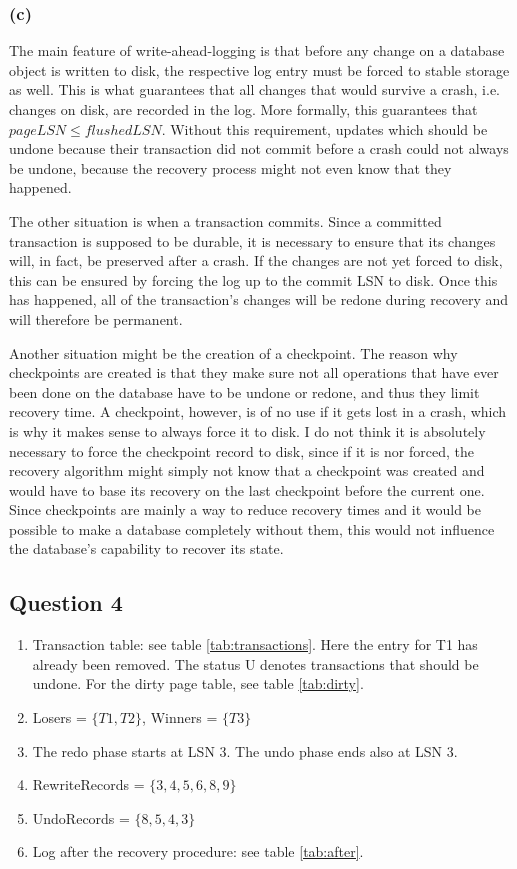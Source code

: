 \documentclass[12pt,a4paper]{article}
\begin{document}
\subsubsection*{(c)}
The main feature of write-ahead-logging is that before any change on a database object is written to disk, the respective log entry must be forced to stable storage as well. This is what guarantees that all changes that would survive a crash, i.e. changes on disk, are recorded in the log. More formally, this guarantees that $pageLSN \leq flushedLSN$. Without this requirement, updates which should be undone because their transaction did not commit before a crash could not always be undone, because the recovery process might not even know that they happened.

The other situation is when a transaction commits. Since a committed transaction is supposed to be durable, it is necessary to ensure that its changes will, in fact, be preserved after a crash. If the changes are not yet forced to disk, this can be ensured by forcing the log up to the commit LSN to disk. Once this has happened, all of the transaction's changes will be redone during recovery and will therefore be permanent.

Another situation might be the creation of a checkpoint. The reason why checkpoints are created is that they make sure not all operations that have ever been done on the database have to be undone or redone, and thus they limit recovery time. A checkpoint, however, is of no use if it gets lost in a crash, which is why it makes sense to always force it to disk. I do not think it is absolutely necessary to force the checkpoint record to disk, since if it is nor forced, the recovery algorithm might simply not know that a checkpoint was created and would have to base its recovery on the last checkpoint before the current one. Since checkpoints are mainly a way to reduce recovery times and it would be possible to make a database completely without them, this would not influence the database's capability to recover its state.


\subsection*{Question 4}
\label{sec:eq4}

\begin{enumerate}
  \item Transaction table: see table \ref{tab:transactions}. Here the entry for T1 has already been removed. The status U denotes transactions that should be undone. For the dirty page table, see table \ref{tab:dirty}.
  \item Losers = $\{T1, T2\}$, Winners = $\{T3\}$
  \item The redo phase starts at LSN 3. The undo phase ends also at LSN 3. 
  \item RewriteRecords = $\{3,4,5,6,8,9\}$
  \item UndoRecords = $\{8,5,4,3\}$
  \item Log after the recovery procedure: see table \ref{tab:after}.
\end{enumerate}
\end{document}
